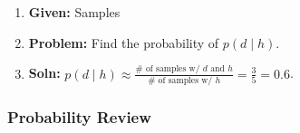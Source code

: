 \begin{example}
    \begin{enumerate}
        \item \textbf{Given:} Samples 
        \item \textbf{Problem:} Find the probability of $p(d \mid h)$.
        \item \textbf{Soln:} $p(d \mid h) \approx \frac{\# \text{ of samples w/ } d \text{ and } h}{\# \text{ of samples w/ } h} = \frac{3}{5} = 0.6$.
    \end{enumerate}
\end{example}
\newpage

\subsubsection{Probability Review}
